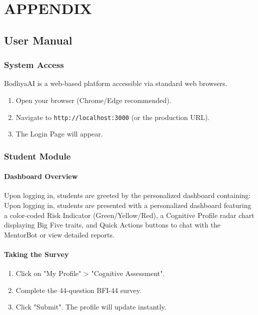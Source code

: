 \documentclass[12pt,a4paper]{report}
\begin{document}


\appendix
\clearpage
{}
\chapter*{\centering APPENDIX}
\setcounter{section}{0}
\renewcommand{\thesection}{A.\arabic{section}}
\section{User Manual}

\subsection{System Access}
BodhyaAI is a web-based platform accessible via standard web browsers.
\begin{enumerate}
    \item Open your browser (Chrome/Edge recommended).
    \item Navigate to \texttt{http://localhost:3000} (or the production URL).
    \item The Login Page will appear.
\end{enumerate}

\subsection{Student Module}
\subsubsection{Dashboard Overview}
Upon logging in, students are greeted by the personalized dashboard containing:
Upon logging in, students are presented with a personalized dashboard featuring a color-coded Risk Indicator (Green/Yellow/Red), a Cognitive Profile radar chart displaying Big Five traits, and Quick Actions buttons to chat with the MentorBot or view detailed reports.

\subsubsection{Taking the Survey}
\begin{enumerate}
    \item Click on "My Profile" > "Cognitive Assessment".
    \item Complete the 44-question BFI-44 survey.
    \item Click "Submit". The profile will update instantly.
\end{enumerate}
\end{document}
